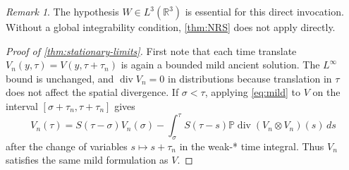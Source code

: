 \documentclass[11pt]{amsart}
\theoremstyle{plain}
\theoremstyle{definition}
\theoremstyle{remark}
\newtheorem{remark}[theorem]{Remark}
\numberwithin{equation}{section}
\begin{document}
\begin{remark}
The hypothesis \(W\in L^3(\mathbb R^3)\) is essential for this direct invocation.
Without a global integrability condition, \cref{thm:NRS} does not apply
directly.
\end{remark}

\begin{proof}[Proof of \cref{thm:stationary-limits}]
First note that each time translate \(V_n(y,\tau)=V(y,\tau+\tau_n)\) is again
a bounded mild ancient solution.  The \(L^\infty\) bound is unchanged, and
\(\operatorname{div}V_n=0\) in distributions because translation in \(\tau\)
does not affect the spatial divergence.  If \(\sigma<\tau\), applying
\eqref{eq:mild} to \(V\) on the interval
\([\sigma+\tau_n,\tau+\tau_n]\) gives
\[
   V_n(\tau)
   =
   S(\tau-\sigma)V_n(\sigma)
   -
   \int_\sigma^\tau
      S(\tau-s)\mathbb P\operatorname{div}
      (V_n\otimes V_n)(s)\,ds
\]
after the change of variables \(s\mapsto s+\tau_n\) in the weak-* time
integral.  Thus \(V_n\) satisfies the same mild formulation as \(V\).


\end{proof}
\end{document}
